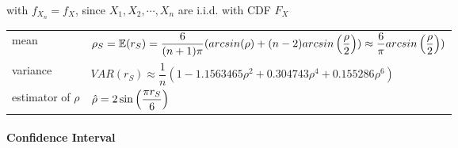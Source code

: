 with $f_{X_n} = f_X$, since $X_1, X_2,\cdots, X_n$ are i.i.d. with CDF $F_X$

\begin{customTableWrapper}{2}
\begin{table}[H]
    \begin{tabular}{l l}
        mean & $
            \rho_S 
            = \mathbb{E}(r_S)
            = \dfrac{6}{(n+1)\pi}
                (arcsin(\rho) + 
                (n - 2) arcsin\left(\dfrac{\rho}{2}\right))
            \approx \dfrac{6}{\pi} arcsin\left(\dfrac{\rho}{2}\right))
        $ \\

        variance & $
            VAR(r_S)
            \approx \dfrac{1}{n} 
                (1 - 1.1563465\rho^{2} + 0.304743\rho^{4} + 0.155286\rho^{6})
        $ \\

        estimator of $\rho$ & $
            \hat{\rho} = 2\sin\left(\dfrac{\pi r_S}{6} \right)
        $ \\

        
    \end{tabular}
\end{table}
\end{customTableWrapper}

\paragraph{Confidence Interval}


